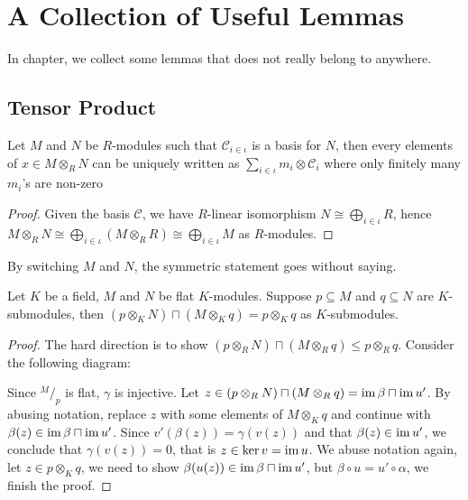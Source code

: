 \setcounter{chapter}{-1}
\chapter{A Collection of Useful Lemmas}

In chapter, we collect some lemmas that does not really belong to anywhere.

\section{Tensor Product}

\begin{lemma}\label{lem:expand-tensor-in-basis}
  Let $M$ and $N$ be $R$-modules such that $\mathcal{C}_{i\in\iota}$ is a basis for $N$, then every elements of $x \in M \otimes_{R} N$ can be uniquely written as $\sum_{i\in\iota}m_{i}\otimes \mathcal{C}_{i}$ where only finitely many $m_{i}$'s are non-zero
\end{lemma}

\begin{proof}
  Given the basis $\mathcal{C}$, we have $R$-linear isomorphism $N \cong\bigoplus_{i\in\iota}R$, hence $M\otimes_{R}N \cong \bigoplus_{i\in\iota}(M\otimes_{R}R)\cong\bigoplus_{i\in\iota}M$ as $R$-modules.
\end{proof}
By switching $M$ and $N$, the symmetric statement goes without saying.


\begin{lemma}

  Let $K$ be a field, $M$ and $N$ be flat $K$-modules. Suppose $p \subseteq M$ and $q \subseteq N$ are $K$-submodules, then $(p \otimes_{K} N) \sqcap (M \otimes_{K} q) = p \otimes_{K} q$ as $K$-submodules.
\end{lemma}

\begin{proof}
  The hard direction is to show $(p \otimes_{R} N) \sqcap (M \otimes_{R} q) \le p \otimes_{R} q$. Consider the following diagram:
  \begin{center}
  \end{center}
  Since $^{M}/_{p}$ is flat, $\gamma$ is injective.
  Let $z \in (p \otimes_{R} N) \sqcap (M \otimes_{R} q) = \operatorname{im} \beta \sqcap \operatorname{im} u'$. By abusing notation, replace $z$ with some elements of $M \otimes_{K} q$ and continue with $\beta(z)\in\operatorname{im} \beta \sqcap \operatorname{im} u'$. Since $v'(\beta(z))=\gamma(v(z))$ and that $\beta(z)\in \operatorname{im} u'$, we conclude that $\gamma(v(z))=0$, that is $z\in\ker v=\operatorname{im} u$. We abuse notation again, let $z \in p \otimes_{K} q$, we need to show $\beta(u(z))\in\operatorname{im} \beta \sqcap \operatorname{im} u'$, but $\beta\circ u=u'\circ\alpha$, we finish the proof.
\end{proof}

